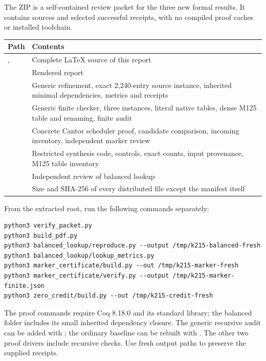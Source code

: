 The ZIP is a self-contained review packet for the three new formal results.
It contains sources and selected successful receipts, with no compiled
proof caches or installed toolchain.

\begin{center}
\begin{tabular}{@{}P{.26\textwidth}P{.68\textwidth}@{}}\toprule
Path & Contents\\\midrule
{},  & Complete LaTeX source of this report\\
 & Rendered report\\
 & Generic refinement, exact 2,240-entry source
instance, inherited minimal dependencies, metrics and receipts\\
 & Generic finite checker, three instances,
literal native tables, dense M125 table and renaming, finite audit\\
 & Concrete Cantor scheduler proof, candidate comparison,
incoming inventory, independent marker review\\
 & Restricted synthesis code, controls, exact counts,
input provenance, M125 table inventory\\
 & Independent review of balanced lookup\\
 & Size and SHA-256 of every distributed file except
the manifest itself\\\bottomrule
\end{tabular}
\end{center}

From the extracted root, run the following commands separately:
\begin{verbatim}
python3 verify_packet.py
python3 build_pdf.py
python3 balanced_lookup/reproduce.py --output /tmp/k215-balanced-fresh
python3 balanced_lookup/lookup_metrics.py
python3 marker_certificate/build.py --out /tmp/k215-marker-fresh
python3 marker_certificate/verify.py --output /tmp/k215-marker-finite.json
python3 zero_credit/build.py --out /tmp/k215-credit-fresh
\end{verbatim}

The proof commands require Coq 8.18.0 and its standard library; the balanced
folder includes its small inherited dependency closure. The generic
recursive audit can be added with ; the ordinary
baseline can be rebuilt with . The other two proof
drivers include recursive checks. Use fresh output paths to preserve
the supplied receipts.

